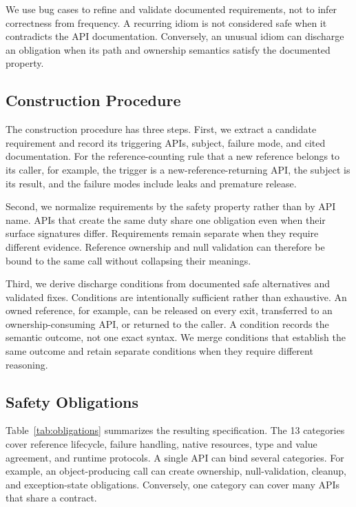 We use bug cases to refine and validate documented requirements, not to infer
correctness from frequency. A recurring idiom is not considered safe when it
contradicts the API documentation. Conversely, an unusual idiom can discharge
an obligation when its path and ownership semantics satisfy the documented
property.

\subsection{Construction Procedure}

The construction procedure has three steps. First, we extract a candidate
requirement and record its triggering APIs, subject, failure mode, and cited
documentation. For the reference-counting rule that a new reference belongs
to its caller, for example, the trigger is a new-reference-returning API, the
subject is its result, and the failure modes include leaks and premature
release.

Second, we normalize requirements by the safety property rather than by API
name. APIs that create the same duty share one obligation even when their
surface signatures differ. Requirements remain separate when they require
different evidence. Reference ownership and null validation can therefore be
bound to the same call without collapsing their meanings.

Third, we derive discharge conditions from documented safe alternatives and
validated fixes. Conditions are intentionally sufficient rather than
exhaustive. An owned reference, for example, can be released on every exit,
transferred to an ownership-consuming API, or returned to the caller. A
condition records the semantic outcome, not one exact syntax. We merge
conditions that establish the same outcome and retain separate conditions
when they require different reasoning.

\subsection{Safety Obligations}

Table~\ref{tab:obligations} summarizes the resulting specification. The 13
categories cover reference lifecycle, failure handling, native resources,
type and value agreement, and runtime protocols. A single API can bind several
categories. For example, an object-producing call can create ownership,
null-validation, cleanup, and exception-state obligations. Conversely, one
category can cover many APIs that share a contract.

